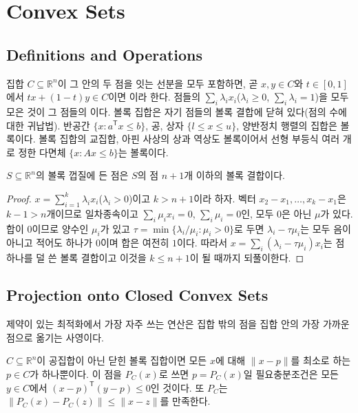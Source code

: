 \section{Convex Sets}
\label{sec:convex-sets}

\subsection{Definitions and Operations}

집합 $C\subseteq\mathbb R^n$이 그 안의 두 점을 잇는 선분을 모두 포함하면, 곧 $x,y\in C$와 $t\in[0,1]$에서 $tx+(1-t)y\in C$이면 이라 한다. 점들의  $\sum_i\lambda_ix_i$($\lambda_i\ge0$, $\sum_i\lambda_i=1$)을 모두 모은 것이 그 점들의 이다. 볼록 집합은 자기 점들의 볼록 결합에 닫혀 있다(점의 수에 대한 귀납법). 반공간 $\{x:a^{\mathsf T}x\le b\}$, 공, 상자 $\{l\le x\le u\}$, 양반정치 행렬의 집합은 볼록이다. 볼록 집합의 교집합, 아핀 사상의 상과 역상도 볼록이어서 선형 부등식 여러 개로 정한 다면체 $\{x:Ax\le b\}$는 볼록이다.

\begin{proposition}
\label{prop:caratheodory}
$S\subseteq\mathbb R^n$의 볼록 껍질에 든 점은 $S$의 점 $n+1$개 이하의 볼록 결합이다.
\end{proposition}

\begin{proof}
$x=\sum_{i=1}^k\lambda_ix_i$($\lambda_i>0$)이고 $k>n+1$이라 하자. 벡터 $x_2-x_1,\dots,x_k-x_1$은 $k-1>n$개이므로 일차종속이고 $\sum_i\mu_ix_i=0$, $\sum_i\mu_i=0$인, 모두 $0$은 아닌 $\mu$가 있다. 합이 $0$이므로 양수인 $\mu_i$가 있고 $\tau=\min\{\lambda_i/\mu_i:\mu_i>0\}$로 두면 $\lambda_i-\tau\mu_i$는 모두 음이 아니고 적어도 하나가 $0$이며 합은 여전히 $1$이다. 따라서 $x=\sum_i(\lambda_i-\tau\mu_i)x_i$는 점 하나를 덜 쓴 볼록 결합이고 이것을 $k\le n+1$이 될 때까지 되풀이한다.
\end{proof}

\subsection{Projection onto Closed Convex Sets}

제약이 있는 최적화에서 가장 자주 쓰는 연산은 집합 밖의 점을 집합 안의 가장 가까운 점으로 옮기는 사영이다.

\begin{theorem}[사영 정리]
\label{thm:projection}
$C\subseteq\mathbb R^n$이 공집합이 아닌 닫힌 볼록 집합이면 모든 $x$에 대해 $\|x-p\|$를 최소로 하는 $p\in C$가 하나뿐이다. 이 점을 $P_C(x)$로 쓰면 $p=P_C(x)$일 필요충분조건은 모든 $y\in C$에서 $(x-p)^{\mathsf T}(y-p)\le0$인 것이다. 또 $P_C$는 $\|P_C(x)-P_C(z)\|\le\|x-z\|$를 만족한다.
\end{theorem}

